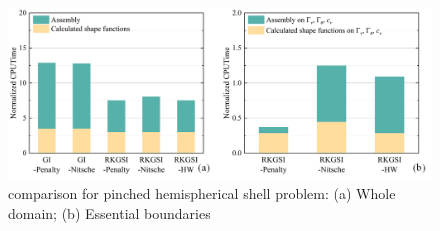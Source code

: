 \begin{figure}[!ht]
\centering
\includegraphics[width=\textwidth]{figures/efficient}
\caption{\DIFdelbeginFL {}\DIFdelendFL \DIFaddbeginFL {}\DIFaddendFL comparison for pinched hemispherical shell problem: (a) Whole domain; (b) Essential boundaries}\label{phf3}
\end{figure}


